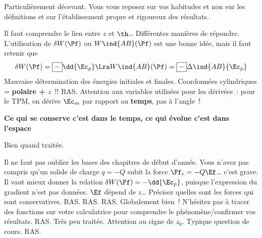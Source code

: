 \documentclass[a4paper, 12pt, final, garamond]{book}
\begin{document}
Particulièrement décevant. Vous vous reposez sur vos habitudes et non sur les
définitions et sur l'établissement propre et rigoureux des résultats.
\begin{enumerate}
	Il faut comprendre le lien entre $z$ et $\th$…
	Différentes manières de répondre. L'utilisation de $\delta W(\Pf)$ ou
	$W\ind{AB}(\Pf)$ est une bonne idée, mais il faut retenir que
	\[
		\delta W(\Pf) = \boxed{-}\dd{\Ec_p}
		\Lra
		W\ind{AB}(\Pf) = \boxed{-}\Delta\ind{AB}{\Ec_p}
	\]
	Mauvaise détermination des énergies initiales et finales.
	Coordonnées cylindriques = \textbf{polaire + $z$}~!!
	RAS.
	Attention aux variables utilisées pour les dérivées~: pour le TPM, on dérive
	$\Ec_m$ par rapport au \textbf{temps}, pas à l'angle~!
	\begin{center}
		\textbf{Ce qui se conserve c'est dans le temps, ce qui évolue c'est dans
			l'espace}
	\end{center}
	Bien quand traitée.
\end{enumerate}

\setcounter{section}{0}
\begin{enumerate}
	Il ne faut pas oublier les bases des chapitres de début d'année.
	Vous n'avez pas compris qu'un solide de charge $q = -Q$ subit la force $\Ff_e
		= -Q\Ef$… c'est grave.
	Il vaut mieux donner la relation $\delta W(\Ff) = -\dd{\Ec_p}$, puisque
	l'expression du gradient n'est pas données.
	$\Ef$ dépend de $z$…
	Précisez quelles sont les forces qui sont conservatives.
	RAS.
	RAS.
	RAS.
	Globalement bien~! N'hésitez pas à tracer des fonctions sur votre calculatrice
	pour comprendre le phénomène/confirmer vos résultats.
	RAS.
	Très peu traitée.
	Attention au signe de $z_0$.
	Typique question de cours.
	RAS.
\end{enumerate}
\end{document}
